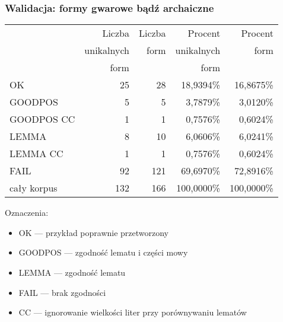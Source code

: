 \documentclass{beamer}
\begin{document}
\begin{frame}
\frametitle{Walidacja: formy gwarowe bądź archaiczne}
\begin{center}\begin{scriptsize}
\begin{tabular}{l|rrrr}
 & Liczba & Liczba & Procent & Procent\\
 & unikalnych & form & unikalnych & form\\
 & form & & form & \\
\hline
OK & 25 & 28 & 18,9394\% & 16,8675\% \\
GOODPOS & 5 & 5 & 3,7879\% & 3,0120\% \\
GOODPOS CC & 1 & 1 & 0,7576\% & 0,6024\% \\
LEMMA & 8 & 10 & 6,0606\% & 6,0241\% \\
LEMMA CC & 1 & 1 & 0,7576\% & 0,6024\% \\
FAIL & 92 & 121 & 69,6970\% & 72,8916\% \\
\hline
cały korpus & 132 & 166 & 100,0000\% & 100,0000\%\\
\end{tabular}
\end{scriptsize}\end{center}
Oznaczenia:
\begin{itemize}
\item OK --- przykład poprawnie przetworzony
\item GOODPOS --- zgodność lematu i części mowy
\item LEMMA --- zgodność lematu
\item FAIL --- brak zgodności
\item CC --- ignorowanie wielkości liter przy porównywaniu lematów
\end{itemize}
\end{frame}
\end{document}
